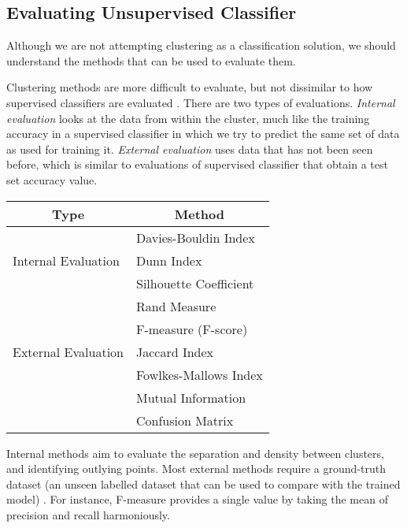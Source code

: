 \subsection{Evaluating Unsupervised Classifier}
Although we are not attempting clustering as a classification solution, we should understand the methods that can be used to evaluate them.

Clustering methods are more difficult to evaluate, but not dissimilar to how supervised classifiers are evaluated \cite{mur-book}. There are two types of evaluations. \textit{Internal evaluation } looks at the data from within the cluster, much like the training accuracy in a supervised classifier in which we try to predict the same set of data as used for training it. \textit{External evaluation} uses data that has not been seen before, which is similar to evaluations of supervised classifier that obtain a test set accuracy value.

\parbox{\linewidth}{
  \centering
  \begin{tabular}{|l|l|}
    \hline
    \multicolumn{1}{|c|}{\textbf{Type}} & \multicolumn{1}{c|}{\textbf{Method}}
    \\\hline
    \multirow{3}{*}{Internal Evaluation} & Davies-Bouldin Index
    \\ & Dunn Index
    \\ & Silhouette Coefficient
    \\\hline
    \multirow{5}{*}{External Evaluation} & Rand Measure
    \\ & F-measure (F-score)
    \\ & Jaccard Index
    \\ & Fowlkes-Mallows Index
    \\ & Mutual Information
    \\ & Confusion Matrix
    \\\hline
  \end{tabular}

  \label{tab:unsupervised-eval}
}

Internal methods aim to evaluate the separation and density between clusters, and identifying outlying points. Most external methods require a ground-truth dataset (an unseen labelled dataset that can be used to compare with the trained model) \cite{cluster-label}. For instance, F-measure provides a single value by taking the mean of precision and recall harmoniously. 

